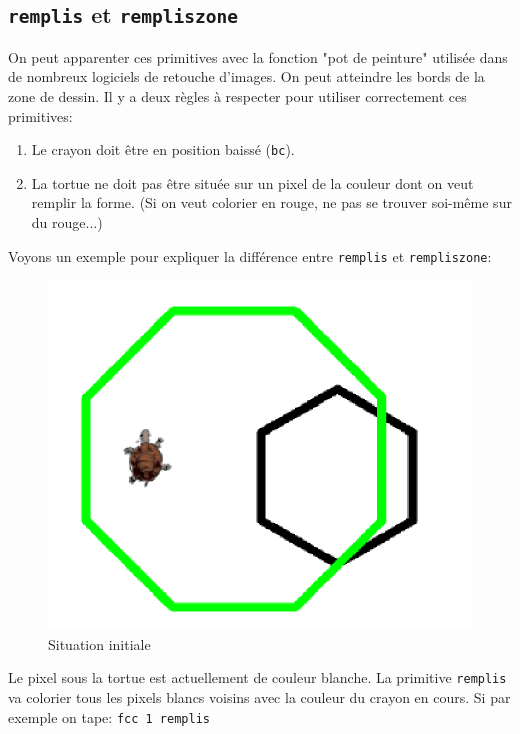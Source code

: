 \subsection{\texttt{remplis} et \texttt{rempliszone}}
 On peut apparenter ces primitives avec la fonction "pot de peinture" utilisée dans de nombreux logiciels de retouche d'images. On peut atteindre les bords de la zone de dessin. Il y a deux règles à respecter pour utiliser correctement ces primitives:
\begin{enumerate}
\item Le crayon doit être en position baissé (\texttt{bc}).
\item La tortue ne doit pas être située sur un pixel de la couleur dont on veut remplir la forme. (Si on veut colorier en rouge, ne pas se trouver soi-même sur du rouge...)
\end{enumerate} 
\noindent Voyons un exemple pour expliquer la différence entre \texttt{remplis} et \texttt{rempliszone}:
\begin{figure}[h]
\begin{center}
\includegraphics*[scale=0.2]{images/remplis.png}
\caption{Situation initiale}
\end{center}
\end{figure}
\noindent
Le pixel sous la tortue est actuellement de couleur blanche. La primitive \texttt{remplis} va colorier tous les pixels blancs voisins avec la couleur du crayon en cours. Si par exemple on tape: \texttt{fcc 1 remplis}

